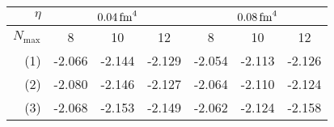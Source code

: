 \begin{table}[H]
  \caption{Extrapolation results in \si[]{\mega\electronvolt} of the difference based framework for the nuclei  \textbf{(a)},  \textbf{(b)} and  \textbf{(c)}. For each interaction characterized by the flow parameter $\eta = \srg{0.04}, \srg{0.08}$, the final extrapolation results for the given $N_\mathrm{max}$ value is shown. Here, \textbf{(1)} is our basic extrapolation without further modifications of the training step, \textbf{(2)} is the $N_\mathrm{max}$-limitation training mode, \textbf{(3)} is the SRG-filter training mode. }
  \label{tab:eval_diff}
  \centering
  \begin{subtable}{\textwidth}
    \caption{}
    \centering
    \begin{tabular}{
        r|
        S[table-format=-2.3(3)]
        S[table-format=-2.3(3)]
        S[table-format=-2.3(3)]
        S[table-format=-2.3(3)]
        S[table-format=-2.3(3)]
        S[table-format=-2.3(3)]
      }
      \toprule
      $\eta$                           &
       &
         \\
      \midrule
      $N_\mathrm{max}$                 &
      {8}                              &
      {10}                             &
      {12}                             &
      {8}                              &
      {10}                             &
      {12}                               \\
      \midrule
      (1)                              &
      -2.066                  &
      -2.144                  &
      -2.129                  &
      -2.054                  &
      -2.113                  &
      -2.126                    \\
      (2)                              &
      -2.080                  &
      -2.146                  &
      -2.127                  &
      -2.064                  &
      -2.110                  &
      -2.124                    \\
      (3)                              &
      -2.068                  &
      -2.153                  &
      -2.149                  &
      -2.062                  &
      -2.124                  &
      -2.158                    \\
      \bottomrule
    \end{tabular}

\end{subtable}
\end{table}
